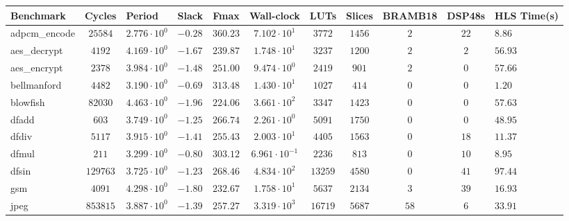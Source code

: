 \begin{tabular}{|l|c|HHc|c|c|c|c|cH|}
\hline
Benchmark     & Cycles       & Period                 & Slack     & Fmax       & Wall-clock              & LUTs      & Slices    & BRAMB18 & DSP48s  & HLS Time(s) \\
\hline
adpcm\_encode & $ 25584    $ & $ 2.776 \cdot 10^{0} $ & $ -0.28 $ & $ 360.23 $ & $ 7.102 \cdot 10^{1}  $ & $ 3772  $ & $ 1456  $ & $ 2   $ & $ 22  $ & $ 8.86    $ \\
aes\_decrypt  & $ 4192     $ & $ 4.169 \cdot 10^{0} $ & $ -1.67 $ & $ 239.87 $ & $ 1.748 \cdot 10^{1}  $ & $ 3237  $ & $ 1200  $ & $ 2   $ & $ 2   $ & $ 56.93   $ \\
aes\_encrypt  & $ 2378     $ & $ 3.984 \cdot 10^{0} $ & $ -1.48 $ & $ 251.00 $ & $ 9.474 \cdot 10^{0}  $ & $ 2419  $ & $ 901   $ & $ 2   $ & $ 0   $ & $ 57.66   $ \\
bellmanford   & $ 4482     $ & $ 3.190 \cdot 10^{0} $ & $ -0.69 $ & $ 313.48 $ & $ 1.430 \cdot 10^{1}  $ & $ 1027  $ & $ 414   $ & $ 0   $ & $ 0   $ & $ 1.20    $ \\
blowfish      & $ 82030    $ & $ 4.463 \cdot 10^{0} $ & $ -1.96 $ & $ 224.06 $ & $ 3.661 \cdot 10^{2}  $ & $ 3347  $ & $ 1423  $ & $ 0   $ & $ 0   $ & $ 57.63   $ \\
dfadd         & $ 603      $ & $ 3.749 \cdot 10^{0} $ & $ -1.25 $ & $ 266.74 $ & $ 2.261 \cdot 10^{0}  $ & $ 5091  $ & $ 1750  $ & $ 0   $ & $ 0   $ & $ 48.95   $ \\
dfdiv         & $ 5117     $ & $ 3.915 \cdot 10^{0} $ & $ -1.41 $ & $ 255.43 $ & $ 2.003 \cdot 10^{1}  $ & $ 4405  $ & $ 1563  $ & $ 0   $ & $ 18  $ & $ 11.37   $ \\
dfmul         & $ 211      $ & $ 3.299 \cdot 10^{0} $ & $ -0.80 $ & $ 303.12 $ & $ 6.961 \cdot 10^{-1} $ & $ 2236  $ & $ 813   $ & $ 0   $ & $ 10  $ & $ 8.95    $ \\
dfsin         & $ 129763   $ & $ 3.725 \cdot 10^{0} $ & $ -1.23 $ & $ 268.46 $ & $ 4.834 \cdot 10^{2}  $ & $ 13259 $ & $ 4580  $ & $ 0   $ & $ 41  $ & $ 97.44   $ \\
gsm           & $ 4091     $ & $ 4.298 \cdot 10^{0} $ & $ -1.80 $ & $ 232.67 $ & $ 1.758 \cdot 10^{1}  $ & $ 5637  $ & $ 2134  $ & $ 3   $ & $ 39  $ & $ 16.93   $ \\
jpeg          & $ 853815   $ & $ 3.887 \cdot 10^{0} $ & $ -1.39 $ & $ 257.27 $ & $ 3.319 \cdot 10^{3}  $ & $ 16719 $ & $ 5687  $ & $ 58  $ & $ 6   $ & $ 33.91   $ \\

\end{tabular}
